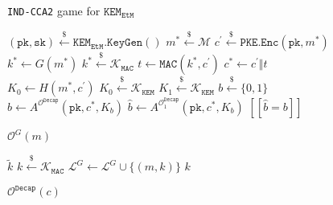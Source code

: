 \documentclass[journal=tches,submission]{iacrtrans}
\newcommand{\pke}{\texttt{PKE}}
\newcommand{\keygen}{\texttt{KeyGen}}
\newcommand{\encrypt}{\texttt{Enc}}
\newcommand{\kem}{\texttt{KEM}}
\newcommand{\decap}{\texttt{Decap}}
\newcommand{\etm}{\texttt{EtM}}  %
\newcommand{\mac}{\texttt{MAC}}
\newcommand{\pk}{\texttt{pk}}
\newcommand{\sk}{\texttt{sk}}
\newcommand{\leftsample}{\stackrel{\$}{\leftarrow}}
\newcommand{\llbrack}{[\![}
\newcommand{\rrbrack}{]\!]}
\begin{document}
\begin{figure}[h]
    \centering
    \begin{minipage}[t]{0.5\textwidth}
        \begin{algorithm}[H]
            \caption*{\texttt{IND-CCA2} game for $\kem_\etm$}
            \begin{algorithmic}[1]
                \State $(\pk, \sk) \leftsample \kem_\etm\texttt{.}\keygen()$
                \State $m^\ast \leftsample \mathcal{M}$
                \State $c^\prime \leftsample \pke\texttt{.}\encrypt(\pk, m^\ast)$
                \State $k^\ast \leftarrow G(m^\ast)$
                \State $k^\ast \leftsample \mathcal{K}_\mac$
                \State $t \leftarrow \mac(k^\ast, c^\prime)$
                \State $c^\ast \leftarrow c^\prime \Vert t$
                \State $K_0 \leftarrow H(m^\ast, c^\prime)$
                \State $K_0 \leftsample \mathcal{K}_\kem$
                \State $K_1 \leftsample \mathcal{K}_\kem$
                \State $b \leftsample \{0,1\}$
                \State $\hat{b} \leftarrow A^{\mathcal{O}^\decap}(\pk, c^\ast, K_b)$
                \State $\hat{b} \leftarrow A^{\mathcal{O}^\decap_1}(\pk, c^\ast, K_b)$
                \State \Return $\llbrack \hat{b} = b \rrbrack$
            \end{algorithmic}
        \end{algorithm}
        \begin{algorithm}[H]
            \caption*{$\mathcal{O}^G(m)$}
            \begin{algorithmic}[1]
                    \State \Return $\tilde{k}$
                \EndIf
                \State $k \leftsample \mathcal{K}_\mac$
                \State $\mathcal{L}^G \leftarrow \mathcal{L}^G \cup \{(m, k)\}$
                \State \Return $k$
            \end{algorithmic}
        \end{algorithm}
    \end{minipage}
    \begin{minipage}[t]{0.49\textwidth}
        \begin{algorithm}[H]
            \caption*{$\mathcal{O}^\decap(c)$}
            \begin{algorithmic}[1]

\end{algorithmic}
\end{algorithm}
\end{minipage}
\end{figure}
\end{document}
